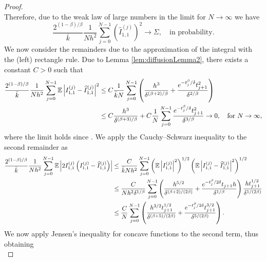 \documentclass[10pt]{article}
\begin{document}
\begin{proof}
\begin{equation}
\end{equation}
Therefore, due to the weak law of large numbers in the limit for $N \to \infty$ we have
\begin{equation}
	\frac{2^{(1-\beta)/\beta}}{\bar k} \frac1{Nh^2} \sum_{j=0}^{N-1} \left(\widehat I_{1,1}^{(j)} \right)^2 \to \Sigma, \quad \text{in probability.}
\end{equation}
We now consider the remainders due to the approximation of the integral with the (left) rectangle rule. Due to Lemma \ref{lem:diffusionLemma2}, there exists a constant $C > 0$ such that
\begin{equation}
\begin{aligned}
	\frac{2^{(1-\beta)/\beta}}{\bar k} \frac1{Nh^2} \sum_{j=0}^{N-1} \operatorname{\mathbb{E}} \left\lvert I_{1,1}^{(j)} - \widehat I_{1,1}^{(j)}\right\rvert^2 &\leq C \frac{1}{\bar k N} \sum_{j=0}^{N-1} \left( \frac{h^3}{\delta^{(\beta+2)/\beta}} +  \frac{e^{-t_j^\beta / \delta} t_{j+1}^2}{\delta^{2/\beta}} \right)\\
	&\leq C \frac{h^3}{\delta^{(\beta + 3)/\beta}} + C \frac1N \sum_{j=0}^{N-1} \frac{e^{-t_j^\beta / \delta} t_{j+1}^2}{\delta^{3/\beta}} \to 0, \quad \text{for } N \to \infty,
\end{aligned}
\end{equation}
where the limit holds since . We apply the Cauchy--Schwarz inequality to the second remainder as
\begin{equation}
\begin{aligned}
	\frac{2^{(1-\beta)/\beta}}{\bar k} \frac1{Nh^2} \sum_{j=0}^{N-1} \operatorname{\mathbb{E}} \left\lvert2I_{1,1}^{(j)}\left(I_{1,1}^{(j)} - \widehat I_{1,1}^{(j)}\right)\right\rvert &\leq \frac{C}{\bar k N h^2} \sum_{j=0}^{N-1} \left(\operatorname{\mathbb{E}} \left\lvert I_{1,1}^{(j)}\right\rvert^2\right)^{1/2} \left( \operatorname{\mathbb{E}}\left\lvert I_{1,1}^{(j)} - \widehat I_{1,1}^{(j)}\right\rvert^2\right)^{1/2} \\
	&\leq \frac{C}{N h^2 \delta^{1/\beta}} \sum_{j=0}^{N-1} \left(\frac{h^{5/2}}{\delta^{(\beta+2)/(2\beta)}} + \frac{e^{-t_j^\beta / 2\delta} t_{j+1}h}{\delta^{1/\beta}}\right)\frac{h t_{j+1}^{1/2}}{\delta^{1/(2\beta)}}\\
	&\leq \frac{C}{N} \sum_{j=0}^{N-1} \left(\frac{h^{3/2}t_{j+1}^{1/2}}{\delta^{(\beta+5)/(2\beta)}} + \frac{e^{-t_j^\beta / 2\delta} t_{j+1}^{3/2}}{\delta^{5/(2\beta)}}\right).
\end{aligned}
\end{equation}
 We now apply Jensen's inequality for concave functions to the second term, thus obtaining	
\begin{equation}

\end{equation}
\end{proof}
\end{document}
